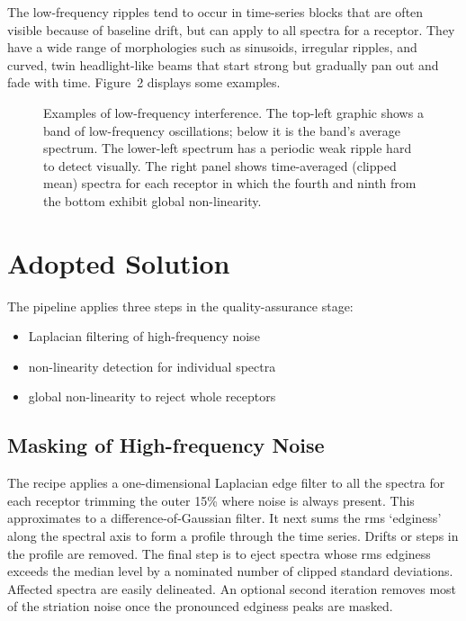 The low-frequency ripples tend to occur in time-series blocks that are often visible because of baseline drift, but can apply to all spectra for a receptor. They have a wide range of morphologies such as sinusoids, irregular ripples, and curved, twin headlight-like beams that start strong but gradually pan out and fade with time.  Figure~2 displays some examples.


\begin{figure}[!ht]
\caption{Examples of low-frequency interference.  The top-left graphic shows a band of low-frequency oscillations; below it is the band's average spectrum.  The lower-left spectrum has a periodic weak ripple hard to detect visually.  The right panel shows time-averaged (clipped mean) spectra for each receptor in which the fourth and ninth from the bottom exhibit global non-linearity.}
\end{figure}

\section{Adopted Solution}

The pipeline applies three steps in the quality-assurance stage: 
\begin{itemize}
\item Laplacian filtering of high-frequency noise
\item non-linearity detection for individual spectra
\item global non-linearity to reject whole receptors
\end{itemize}

\subsection{Masking of High-frequency Noise}
 
The recipe applies a one-dimensional Laplacian edge filter to all the spectra for each receptor trimming the outer 15\% where noise is always present.  This approximates to a difference-of-Gaussian filter. It next sums the rms `edginess' along the spectral axis to form a profile through the time series.  Drifts or steps in the profile are removed.  The final step is to eject spectra whose rms edginess exceeds the median level by a nominated number of clipped standard deviations.  Affected spectra are easily delineated.  An optional second iteration removes most of the striation noise once the pronounced edginess peaks are masked.

